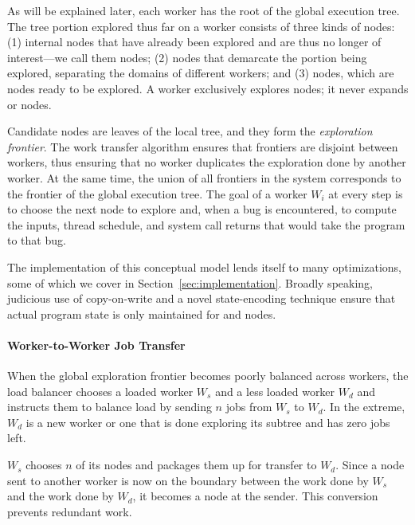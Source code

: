 As will be explained later, each worker has the root of the global execution tree.  The tree portion explored thus far on a worker consists of three kinds of nodes: (1) internal nodes that have already been explored and are thus no longer of interest---we call them {\em \dead} nodes; (2) {\em \fence} nodes that demarcate the portion being explored, separating the domains of different workers; and (3) {\em \candidate} nodes, which are nodes ready to be explored.  A worker exclusively explores \candidate nodes; it never expands \fence or \dead nodes.

Candidate nodes are leaves of the local tree, and they form the \emph{exploration frontier}.  The work transfer algorithm ensures that frontiers are disjoint between workers, thus ensuring that no worker duplicates the exploration done by another worker.  At the same time, the union of all frontiers in the system corresponds to the frontier of the global execution tree. The goal of a worker  $W_i$ at every step is to choose the next \candidate node to explore and, when a bug is encountered, to compute the inputs, thread schedule, and system call returns that would take the program to that bug.

 The implementation of this conceptual model lends itself to many optimizations, some of which we cover in Section~\ref{sec:implementation}.  Broadly speaking, judicious use of copy-on-write and a novel state-encoding technique ensure that actual program state is only maintained for \candidate and \fence nodes.

\paragraph{Worker-to-Worker Job Transfer}
\label{sec:workTransfer}

\newcommand{\wsrc}{\ensuremath{W_s}\xspace}
\newcommand{\wdst}{\ensuremath{W_d}\xspace}

When the global exploration frontier becomes poorly balanced across workers, the load balancer chooses a loaded worker \wsrc and a less loaded worker \wdst  and instructs them to balance load by sending $n$ jobs from \wsrc to \wdst.  In the extreme, \wdst is a new worker or one that is done exploring its subtree and has zero jobs left.  

\wsrc chooses $n$ of its \candidate nodes and packages them up for transfer to \wdst.  Since a \candidate node sent to another worker is now on the boundary between the work done by \wsrc and the work done by \wdst, it becomes a \fence node at the sender.  This conversion prevents redundant work.

